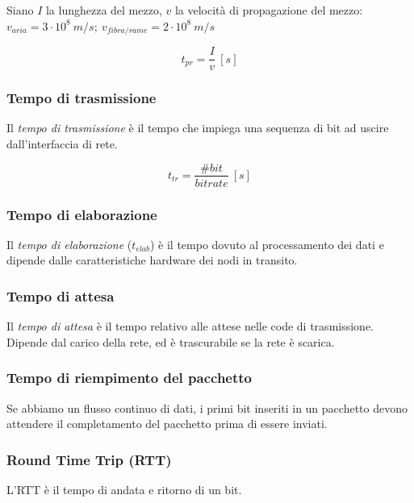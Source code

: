             Siano $I$ la lunghezza del mezzo, $v$ la velocità di propagazione del mezzo: 
            \begin{math}
                v_{aria} = 3 \cdot 10^8 ~ m/s; ~ v_{fibra/rame} = 2 \cdot 10^8 ~ m/s
            \end{math}

            \begin{equation*}
                t_{pr} = \frac{I}{v} ~ [s]
            \end{equation*}

        \subsubsection{Tempo di trasmissione}
            Il \textit{tempo di trasmissione} è il tempo che impiega una sequenza di bit ad uscire dall'interfaccia di rete.

            \begin{equation*}
                t_{tr} = \frac{\#bit}{bitrate} ~ [s]
            \end{equation*}

        \subsubsection{Tempo di elaborazione}
            Il \textit{tempo di elaborazione} ($t_{elab}$) è il tempo dovuto al processamento dei dati e dipende dalle caratteristiche hardware dei nodi in transito.
            
        \subsubsection{Tempo di attesa}
            Il \textit{tempo di attesa} è il tempo relativo alle attese nelle code di trasmissione. Dipende dal carico della rete, ed è trascurabile se la rete è scarica.

        \subsubsection{Tempo di riempimento del pacchetto}
            Se abbiamo un flusso continuo di dati, i primi bit inseriti in un pacchetto devono attendere il completamento del pacchetto prima di essere inviati.

        \subsubsection{Round Time Trip (RTT)}
            L'RTT è il tempo di andata e ritorno di un bit.

